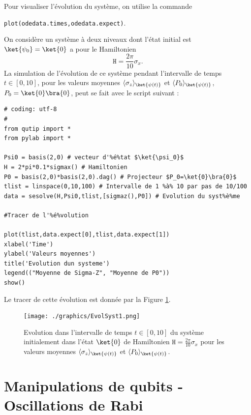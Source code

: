 Pour visualiser l'évolution du système, on utilise la commande 
\begin{center}
\texttt{plot(odedata.times,odedata.expect)}.
\end{center}

\begin{example}
On considère un système à deux niveaux dont l'état initial est 
$\ket{\psi_0}=\ket{0}$ a pour le Hamiltonien
\begin{equation}
\mathtt{H} = \frac{2\pi}{10}\sigma_x.
\end{equation}
La simulation de l'évolution de ce système pendant l'intervalle de temps 
$t\in[0,10]$, pour les valeurs moyennes $\av{\sigma_z}_{\ket{\psi(t)}}$ et 
$\av{P_0}_{\ket{\psi(t)}}$, $P_0=\ket{0}\bra{0}$, peut se fait avec le 
script suivant :
\end{example}
\begin{lstlisting}[commentstyle=\scriptsize]
# coding: utf-8 
#
from qutip import *
from pylab import *

Psi0 = basis(2,0) # vecteur d'%é%tat $\ket{\psi_0}$
H = 2*pi*0.1*sigmax() # Hamiltonien
P0 = basis(2,0)*basis(2,0).dag() # Projecteur $P_0=\ket{0}\bra{0}$
tlist = linspace(0,10,100) # Intervalle de 1 %à% 10 par pas de 10/100
data = sesolve(H,Psi0,tlist,[sigmaz(),P0]) # Evolution du syst%è%me

#Tracer de l'%é%volution

plot(tlist,data.expect[0],tlist,data.expect[1])
xlabel('Time')
ylabel('Valeurs moyennes')
title('Evolution dun systeme')
legend(("Moyenne de Sigma-Z", "Moyenne de P0"))
show()
\end{lstlisting}
Le tracer de cette évolution est donnée par la Figure \ref{fig:EvolSyst1}.

\begin{figure}[htbp]
\centering
 \texttt{[image: ./graphics/EvolSyst1.png]}
 \caption{Evolution dans l'intervalle de temps $t\in[0,10]$ du système 
initialement dans l'état $\ket{0}$ de Hamiltonien $\mathtt{H} = 
\frac{2\pi}{10}\sigma_x$ pour les valeurs moyennes 
$\av{\sigma_z}_{\ket{\psi(t)}}$ et $\av{P_0}_{\ket{\psi(t)}}$.}
 \label{fig:EvolSyst1}
\end{figure}

\section{Manipulations de qubits - Oscillations de Rabi}
\label{sec:ESpin12}

